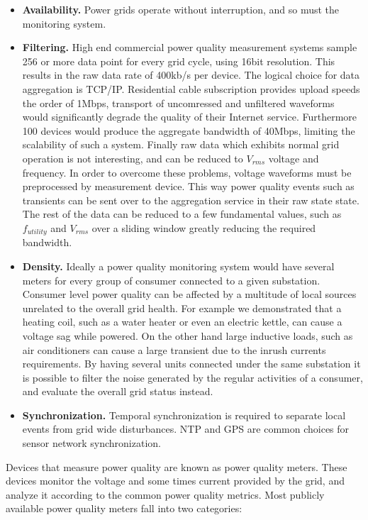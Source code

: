 \begin{itemize}
\item \textbf{Availability.} Power grids operate without interruption, and so must the monitoring system.

\item \textbf{Filtering.} High end commercial power quality measurement systems sample 256 or more data point for every grid cycle, using 16bit resolution. This results in the raw data rate of 400kb/s per device. The logical choice for data aggregation is TCP/IP. Residential cable  subscription provides upload speeds the order of 1Mbps, transport of uncomressed and unfiltered waveforms would significantly degrade the quality of their Internet service. Furthermore 100 devices would produce the aggregate bandwidth of 40Mbps, limiting the scalability of such a system. Finally raw data which exhibits normal grid operation is not interesting, and can be reduced to $V_{rms}$ voltage and frequency. In order to overcome these problems, voltage waveforms must be preprocessed by measurement device. This way power quality events such as transients can be sent over to the aggregation service in their
raw state state. The rest of the data can be reduced to a few fundamental values, such as $f_{utility}$ and $V_{rms}$ over a sliding window greatly reducing the required bandwidth.

\item \textbf{Density.} Ideally a power quality monitoring system would have several meters for every group of consumer connected to a given
substation. Consumer level power quality can be affected by a multitude of local sources unrelated to the overall grid health. For example we demonstrated that 
a heating coil, such as a water heater or even an electric kettle, can cause a voltage sag while powered. On the other hand large inductive loads, such as air conditioners 
can cause a large transient due to the inrush currents requirements. By having several units connected under the same substation it is possible to filter the noise generated
by the regular activities of a consumer, and evaluate the overall grid status instead.

\item \textbf{Synchronization.} Temporal synchronization is required to separate local events from grid wide disturbances.  NTP and GPS are common choices for sensor network synchronization. 

\end{itemize}

Devices that measure power quality are known as power quality meters. These devices monitor the voltage and some times current provided by the grid, and analyze it according to the common power quality metrics. Most publicly available power quality meters fall into two categories:

